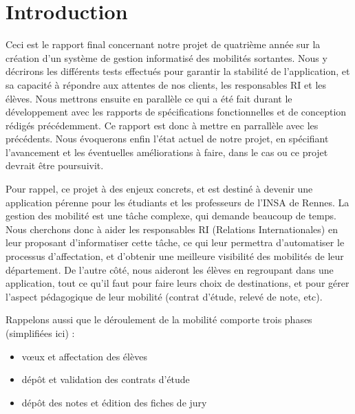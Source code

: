 \chapter{Introduction}

Ceci est le rapport final concernant notre projet de quatrième année sur la création d'un système de gestion informatisé des mobilités sortantes. Nous y décrirons les différents tests effectués pour garantir la stabilité de l'application, et sa capacité à répondre aux attentes de nos clients, les responsables RI et les élèves. Nous mettrons ensuite en parallèle ce qui a été fait durant le développement avec les rapports de spécifications fonctionnelles et de conception rédigés précédemment. Ce rapport est donc à mettre en parrallèle avec les précédents. Nous évoquerons enfin l'état actuel de notre projet, en spécifiant l'avancement et les éventuelles améliorations à faire, dans le cas ou ce projet devrait être poursuivit.

\smallbreak

Pour rappel, ce projet à des enjeux concrets, et est destiné à devenir une application pérenne pour les étudiants et les professeurs de l'INSA de Rennes. La gestion des mobilité est une tâche complexe, qui demande beaucoup de temps. Nous cherchons donc à aider les responsables RI (Relations Internationales) en leur proposant d'informatiser cette tâche, ce qui leur permettra d'automatiser le processus d'affectation, et d'obtenir une meilleure visibilité des mobilités de leur département. De l'autre côté, nous aideront les élèves en regroupant dans une application, tout ce qu'il faut pour faire leurs choix de destinations, et pour gérer l'aspect pédagogique de leur mobilité (contrat d'étude, relevé de note, etc).

\smallbreak

Rappelons aussi que le déroulement de la mobilité comporte trois phases (simplifiées ici) : 
\begin{itemize}
	\item vœux et affectation des élèves
	\item dépôt et validation des contrats d'étude
	\item dépôt des notes et édition des fiches de jury
\end{itemize}